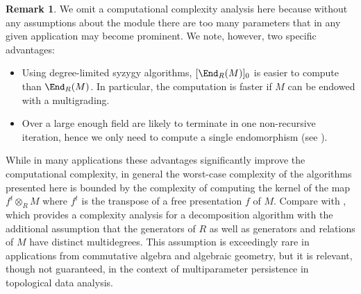 \documentclass[12pt]{article}
\def\cF{\mathcal F}
\def\OO{\mathcal O}
\let\inc\hookrightarrow
\theoremstyle{theorem}
\numberwithin{thm}{section}
\newtheorem{lem}[thm]{Lemma}
\theoremstyle{definition}
\newtheorem{rem}[thm]{Remark}
\begin{document}


\begin{rem}\label{rem:complexity}
  We omit a computational complexity analysis here because without any assumptions about the module there are too many parameters that in any given application may become prominent. We note, however, two specific advantages:
  \begin{itemize}
  \item Using degree-limited syzygy algorithms, $[\End_R(M)]_0$ is easier to compute than $\End_R(M)$. In particular, the computation is faster if $M$ can be endowed with a multigrading.
  \item Over a large enough field  are likely to terminate in one non-recursive iteration, hence we only need to compute a single endomorphism (see ).
  \end{itemize}
   While in many applications these advantages significantly improve the computational complexity, in general the worst-case complexity of the algorithms presented here is bounded by the complexity of computing the kernel of the map $f^t\otimes_R M$ where $f^t$ is the transpose of a free presentation $f$ of $M$. Compare with \cite{DX22}, which provides a complexity analysis for a decomposition algorithm with the additional assumption that the generators of $R$ as well as generators and relations of $M$ have distinct multidegrees. This assumption is exceedingly rare in applications from commutative algebra and algebraic geometry, but it is relevant, though not guaranteed, in the context of multiparameter persistence in topological data analysis.
\end{rem}
\end{document}
